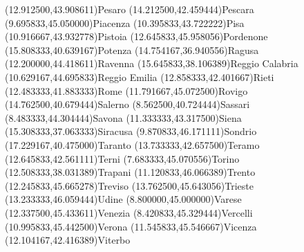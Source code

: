 \mapput[0](12.912500,43.908611){Pesaro}
\mapput[90](14.212500,42.459444){Pescara}
\mapput[90](9.695833,45.050000){Piacenza}
\mapput[90](10.395833,43.722222){Pisa}
\mapput[90](10.916667,43.932778){Pistoia}
\mapput[90](12.645833,45.958056){Pordenone}
\mapput[90](15.808333,40.639167){Potenza}
\mapput[0](14.754167,36.940556){Ragusa}
\mapput[90](12.200000,44.418611){Ravenna}
\mapput[0](15.645833,38.106389){Reggio Calabria}
\mapput[50](10.629167,44.695833){Reggio Emilia}
\mapput[90](12.858333,42.401667){Rieti}
\mapput[90](12.483333,41.883333){Rome}
\mapput[90](11.791667,45.072500){Rovigo}
\mapput[90](14.762500,40.679444){Salerno}
\mapput[90](8.562500,40.724444){Sassari}
\mapput[90](8.483333,44.304444){Savona}
\mapput[90](11.333333,43.317500){Siena}
\mapput[0](15.308333,37.063333){Siracusa}
\mapput[90](9.870833,46.171111){Sondrio}
\mapput[90](17.229167,40.475000){Taranto}
\mapput[90](13.733333,42.657500){Teramo}
\mapput[90](12.645833,42.561111){Terni}
\mapput[90](7.683333,45.070556){Torino}
\mapput[90](12.508333,38.031389){Trapani}
\mapput[90](11.120833,46.066389){Trento}
\mapput[90](12.245833,45.665278){Treviso}
\mapput[90](13.762500,45.643056){Trieste}
\mapput[90](13.233333,46.059444){Udine}
\mapput[90](8.800000,45.000000){Varese}
\mapput[0](12.337500,45.433611){Venezia}
\mapput[90](8.420833,45.329444){Vercelli}
\mapput[90](10.995833,45.442500){Verona}
\mapput[90](11.545833,45.546667){Vicenza}
\mapput[90](12.104167,42.416389){Viterbo}
\endinput 